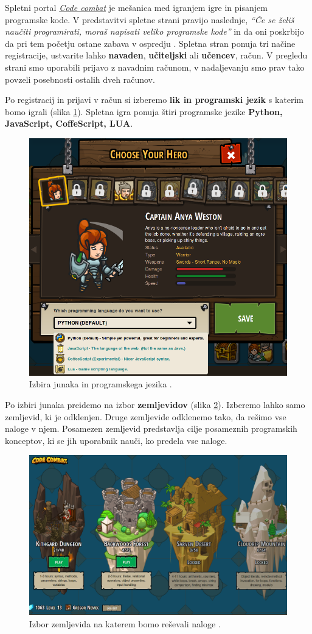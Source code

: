 Spletni portal \emph{\href{https://codecombat.com/}{Code combat}}
\cite{web:codecombat} je mešanica med igranjem igre in pisanjem
programske kode. V predstavitvi spletne strani pravijo naslednje,
\emph{``Če se želiš naučiti programirati, moraš napisati veliko
  programske kode''} in da oni poskrbijo da pri tem početju ostane
zabava v ospredju \cite{web:codecombat:about}. Spletna stran ponuja
tri načine registracije, ustvarite lahko \textbf{navaden},
\textbf{učiteljski} ali \textbf{učencev}, račun. V pregledu strani smo
uporabili prijavo z navadnim računom, v nadaljevanju smo prav tako
povzeli posebnosti ostalih dveh računov.

Po registracij in prijavi v račun si izberemo \textbf{lik in
  programski jezik} s katerim bomo igrali (slika
\ref{fig:web:cc:hero}). Spletna igra ponuja štiri programske jezike
\textbf{Python, JavaScript, CoffeScript, LUA}.


\begin{figure}[h!]
  \centering
    \includegraphics [width=0.45\linewidth, keepaspectratio =
   1] {./images/sc_web/cc_hero-lang-v01.png}
   \caption{Izbira junaka in programskega jezika \cite{web:codecombat}.}
   \label{fig:web:cc:hero}
 \end{figure}


 Po izbiri junaka preidemo na izbor \textbf{zemljevidov} (slika
 \ref{fig:web:cc:zemljevid}). Izberemo lahko samo zemljevid, ki je
 odklenjen. Druge zemljevide odklenemo tako, da rešimo vse naloge v
 njem. Posamezen zemljevid predstavlja cilje posameznih programskih
 konceptov, ki se jih uporabnik nauči, ko predela vse naloge.

\begin{figure}[h!]
  \centering
    \includegraphics [width=0.65\linewidth, keepaspectratio =
   1] {./images/sc_web/cc_izbor-zem-v01.png}
   \caption{Izbor zemljevida na katerem bomo reševali naloge
     \cite{web:codecombat}.}
   \label{fig:web:cc:zemljevid}
 \end{figure}

